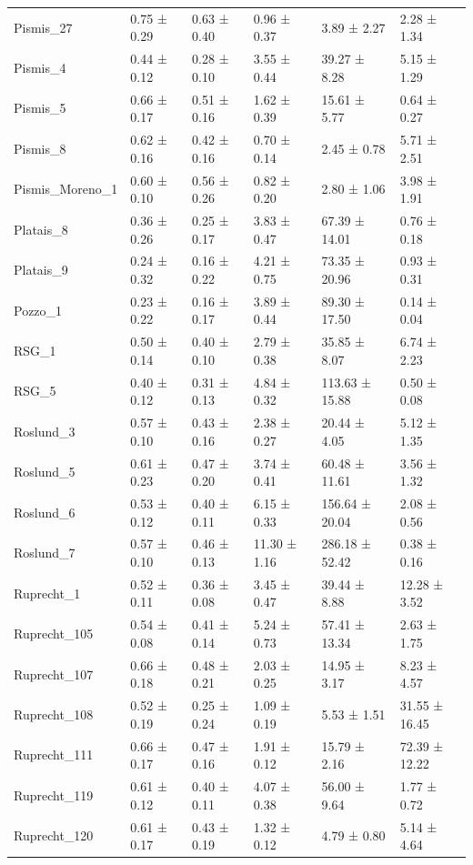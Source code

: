 \begin{tabular}{llllll}
Pismis_27 & 0.75 ± 0.29 & 0.63 ± 0.40 & 0.96 ± 0.37 & 3.89 ± 2.27 & 2.28 ± 1.34 \\
Pismis_4 & 0.44 ± 0.12 & 0.28 ± 0.10 & 3.55 ± 0.44 & 39.27 ± 8.28 & 5.15 ± 1.29 \\
Pismis_5 & 0.66 ± 0.17 & 0.51 ± 0.16 & 1.62 ± 0.39 & 15.61 ± 5.77 & 0.64 ± 0.27 \\
Pismis_8 & 0.62 ± 0.16 & 0.42 ± 0.16 & 0.70 ± 0.14 & 2.45 ± 0.78 & 5.71 ± 2.51 \\
Pismis_Moreno_1 & 0.60 ± 0.10 & 0.56 ± 0.26 & 0.82 ± 0.20 & 2.80 ± 1.06 & 3.98 ± 1.91 \\
Platais_8 & 0.36 ± 0.26 & 0.25 ± 0.17 & 3.83 ± 0.47 & 67.39 ± 14.01 & 0.76 ± 0.18 \\
Platais_9 & 0.24 ± 0.32 & 0.16 ± 0.22 & 4.21 ± 0.75 & 73.35 ± 20.96 & 0.93 ± 0.31 \\
Pozzo_1 & 0.23 ± 0.22 & 0.16 ± 0.17 & 3.89 ± 0.44 & 89.30 ± 17.50 & 0.14 ± 0.04 \\
RSG_1 & 0.50 ± 0.14 & 0.40 ± 0.10 & 2.79 ± 0.38 & 35.85 ± 8.07 & 6.74 ± 2.23 \\
RSG_5 & 0.40 ± 0.12 & 0.31 ± 0.13 & 4.84 ± 0.32 & 113.63 ± 15.88 & 0.50 ± 0.08 \\
Roslund_3 & 0.57 ± 0.10 & 0.43 ± 0.16 & 2.38 ± 0.27 & 20.44 ± 4.05 & 5.12 ± 1.35 \\
Roslund_5 & 0.61 ± 0.23 & 0.47 ± 0.20 & 3.74 ± 0.41 & 60.48 ± 11.61 & 3.56 ± 1.32 \\
Roslund_6 & 0.53 ± 0.12 & 0.40 ± 0.11 & 6.15 ± 0.33 & 156.64 ± 20.04 & 2.08 ± 0.56 \\
Roslund_7 & 0.57 ± 0.10 & 0.46 ± 0.13 & 11.30 ± 1.16 & 286.18 ± 52.42 & 0.38 ± 0.16 \\
Ruprecht_1 & 0.52 ± 0.11 & 0.36 ± 0.08 & 3.45 ± 0.47 & 39.44 ± 8.88 & 12.28 ± 3.52 \\
Ruprecht_105 & 0.54 ± 0.08 & 0.41 ± 0.14 & 5.24 ± 0.73 & 57.41 ± 13.34 & 2.63 ± 1.75 \\
Ruprecht_107 & 0.66 ± 0.18 & 0.48 ± 0.21 & 2.03 ± 0.25 & 14.95 ± 3.17 & 8.23 ± 4.57 \\
Ruprecht_108 & 0.52 ± 0.19 & 0.25 ± 0.24 & 1.09 ± 0.19 & 5.53 ± 1.51 & 31.55 ± 16.45 \\
Ruprecht_111 & 0.66 ± 0.17 & 0.47 ± 0.16 & 1.91 ± 0.12 & 15.79 ± 2.16 & 72.39 ± 12.22 \\
Ruprecht_119 & 0.61 ± 0.12 & 0.40 ± 0.11 & 4.07 ± 0.38 & 56.00 ± 9.64 & 1.77 ± 0.72 \\
Ruprecht_120 & 0.61 ± 0.17 & 0.43 ± 0.19 & 1.32 ± 0.12 & 4.79 ± 0.80 & 5.14 ± 4.64 \\

\end{tabular}
